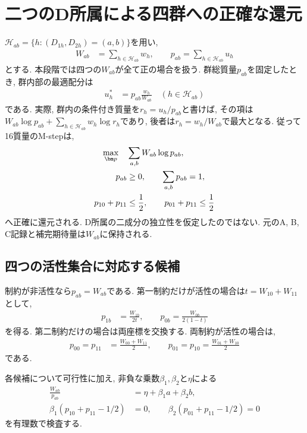 \section{二つのD所属による四群への正確な還元}
\label{sec:stage24_four_groups}

$\mathcal H_{ab}=\{h:(D_{1h},D_{2h})=(a,b)\}$を用い,
\begin{align}
W_{ab}&=\sum_{h\in\mathcal H_{ab}}w_h,\qquad
p_{ab}=\sum_{h\in\mathcal H_{ab}}u_h
\label{eq:stage24_group_masses}
\end{align}
とする. 本段階では四つの$W_{ab}$が全て正の場合を扱う.
群総質量$p_{ab}$を固定したとき, 群内部の最適配分は
\begin{align}
u_h^*&=p_{ab}\frac{w_h}{W_{ab}}
\quad(h\in\mathcal H_{ab})
\label{eq:stage24_within_group}
\end{align}
である. 実際, 群内の条件付き質量を$r_h=u_h/p_{ab}$と書けば,
その項は$W_{ab}\log p_{ab}+\sum_{h\in\mathcal H_{ab}}w_h\log r_h$であり,
後者は$r_h=w_h/W_{ab}$で最大となる.
従って16質量のM-stepは,
\begin{align}
\max_{\bm p}\quad&\sum_{a,b}W_{ab}\log p_{ab},
\label{eq:stage24_group_objective}\\
p_{ab}&\ge0,\qquad \sum_{a,b}p_{ab}=1,\notag\\
p_{10}+p_{11}&\le\frac12,\qquad
p_{01}+p_{11}\le\frac12
\label{eq:stage24_group_constraints}
\end{align}
へ正確に還元される.
D所属の二成分の独立性を仮定したのではない.
元のA, B, C記録と補完期待量は$W_{ab}$に保持される.

\subsection{四つの活性集合に対応する候補}
\label{subsec:stage24_active_sets}

制約が非活性なら$p_{ab}=W_{ab}$である.
第一制約だけが活性の場合は$t=W_{10}+W_{11}$として,
\begin{align}
p_{1b}&=\frac{W_{1b}}{2t},\qquad
p_{0b}=\frac{W_{0b}}{2(1-t)}
\label{eq:stage24_first_active}
\end{align}
を得る. 第二制約だけの場合は両座標を交換する.
両制約が活性の場合は,
\begin{align}
p_{00}=p_{11}&=\frac{W_{00}+W_{11}}2,\qquad
p_{01}=p_{10}=\frac{W_{01}+W_{10}}2
\label{eq:stage24_both_active}
\end{align}
である.

各候補について可行性に加え, 非負な乗数$\beta_1,\beta_2$と$\eta$による
\begin{align}
\frac{W_{ab}}{p_{ab}}
&=\eta+\beta_1a+\beta_2b,
\label{eq:stage24_group_stationarity}\\
\beta_1(p_{10}+p_{11}-1/2)&=0,\qquad
\beta_2(p_{01}+p_{11}-1/2)=0
\label{eq:stage24_group_complementarity}
\end{align}
を有理数で検査する.

